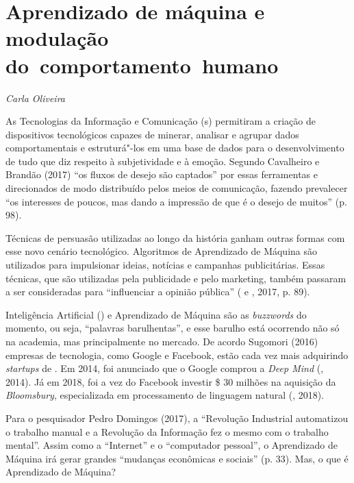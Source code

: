 \chapter*{Aprendizado de máquina e modulação do~comportamento~humano}

\begin{flushright}
\emph{Carla Oliveira}
\end{flushright}

As Tecnologias da Informação e Comunicação (s) permitiram a criação
de dispositivos tecnológicos capazes de minerar, analisar e agrupar
dados comportamentais e estruturá"-los em uma base de dados para o
desenvolvimento de tudo que diz respeito à subjetividade e à emoção.
Segundo Cavalheiro e Brandão (2017) ``os fluxos de desejo são captados''
por essas ferramentas e direcionados de modo distribuído pelos meios de
comunicação, fazendo prevalecer ``os interesses de poucos, mas dando a
impressão de que é o desejo de muitos'' (p. 98).

Técnicas de persuasão utilizadas ao longo da história ganham outras
formas com esse novo cenário tecnológico. Algoritmos de Aprendizado de
Máquina são utilizados para impulsionar ideias, notícias e campanhas
publicitárias. Essas técnicas, que são utilizadas pela publicidade e
pelo marketing, também passaram a ser consideradas para ``influenciar a
opinião pública'' ( e , 2017, p. 89).

Inteligência Artificial () e Aprendizado de Máquina são as
\emph{buzzwords} do momento, ou seja, ``palavras barulhentas'', e esse
barulho está ocorrendo não só na academia, mas principalmente no
mercado. De acordo Sugomori (2016) empresas de tecnologia, como Google e
Facebook, estão cada vez mais adquirindo \emph{startups} de . Em 2014,
foi anunciado que o Google comprou a \emph{Deep Mind} (, 2014). Já
em 2018, foi a vez do Facebook investir \$ 30 milhões na aquisição da
\emph{Bloomsbury}, especializada em processamento de linguagem natural
(, 2018).

Para o pesquisador Pedro Domingos (2017), a ``Revolução Industrial
automatizou o trabalho manual e a Revolução da Informação fez o mesmo
com o trabalho mental''. Assim como a ``Internet'' e o ``computador
pessoal'', o Aprendizado de Máquina irá gerar grandes ``mudanças
econômicas e sociais'' (p. 33). Mas, o que é Aprendizado de Máquina?

